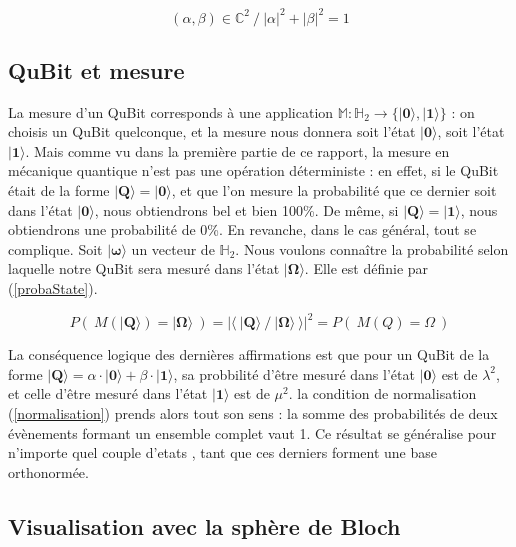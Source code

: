 \documentclass[a4paper,12pt]{report}
\newcommand{\quSt}[1]{\bm{|#1\rangle}}
\newcommand{\icite}[1]{\up{\textit{\cite{#1}}}}
\begin{document}
\begin{equation} \label{normalisation}
	(\alpha,\beta) \in \mathbb{C}^2 ~/~ |\alpha|^2 + |\beta|^2 = 1
\end{equation}

		\subsection{QuBit et mesure}

\par{
	La mesure d'un QuBit\icite{ref2} corresponds à une application $\mathbb{M} : \mathbb{H}_{2} \rightarrow \{ \quSt{0}, \quSt{1} \}$ : on choisis un QuBit quelconque, et la mesure nous donnera soit l'état $\quSt{0}$, soit l'état $\quSt{1}$. Mais comme vu dans la première partie de ce rapport, la mesure en mécanique quantique n'est pas une opération déterministe : en effet, si le QuBit était de la forme $\quSt{Q} = \quSt{0}$, et que l'on mesure la probabilité que ce dernier soit dans l'état $\quSt{0}$, nous obtiendrons bel et bien 100\%. De même, si $\quSt{Q} = \quSt{1}$, nous obtiendrons une probabilité de 0\%. En revanche, dans le cas général, tout se complique. Soit $\quSt{\omega}$ un vecteur de $\mathbb{H}_{2}$. Nous voulons connaître la probabilité selon laquelle notre QuBit sera mesuré dans l'état $\quSt{\Omega}$. Elle est définie par (\ref{probaState}).
}

\begin{equation} \label{probaState}
	P(~ M( \quSt{Q} ) = \quSt{\Omega} ~) = | \langle ~ \quSt{Q} ~/~  \quSt{\Omega} ~\rangle |^2 = P(~ M( Q ) = \Omega ~)
\end{equation}

\vspace{1\baselineskip}

\par{
	La conséquence logique des dernières affirmations est que pour un QuBit de la forme $\quSt{Q} = \alpha \cdot \quSt{0} + \beta \cdot \quSt{1}$, sa probbilité d'être mesuré dans l'état $\quSt{0}$ est de $\lambda^2$, et celle d'être mesuré dans l'état $\quSt{1}$ est de $\mu^2$. la condition de normalisation (\ref{normalisation}) prends alors tout son sens : la somme des probabilités de deux évènements formant un ensemble complet vaut 1. Ce résultat se généralise pour n'importe quel couple d'etats , tant que ces derniers forment une base orthonormée.
}

		\subsection{Visualisation avec la sphère de Bloch}
\end{document}
